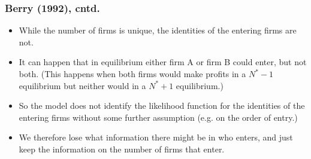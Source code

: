\documentclass[notes=show]{beamer}
\begin{document}
\begin{frame}%

\frametitle{Berry (1992), cntd.}

\begin{itemize}
\item While the number of firms is unique, the identities of the entering
firms are not.

\item It can happen that in equilibrium either firm A or firm B could enter,
but not both. (This happens when both firms would make profits in a $N^{\ast
}-1$ equilibrium but neither would in a $N^{\ast }+1$ equilibrium.)

\item So the model does not identify the likelihood function for the
identities of the entering firms without some further assumption (e.g. on
the order of entry.)

\item We therefore lose what information there might be in who enters, and
just keep the information on the number of firms that enter.
\end{itemize}

\end{frame}%
\end{document}
